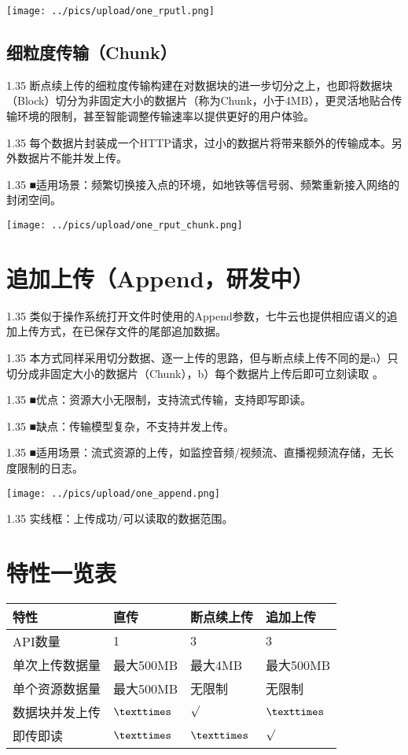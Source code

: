 \documentclass[11pt, oneside]{book}
\newcommand{\qpara}[1]{
\vspace{0.4em}
\begin{spacing}{1.35}
\noindent
#1\par
\end{spacing}
\vspace{0.4em}
}
\newcommand{\qtable}[1]{\footnotesize\vspace{0.5em}#1\vspace{0.5em}\normalsize}
\begin{document}
\begin{center}
\texttt{[image: ../pics/upload/one\_rputl.png]}
\end{center}

\subsection{细粒度传输（Chunk）}

\qpara{断点续上传的细粒度传输构建在对数据块的进一步切分之上，也即将数据块（Block）切分为非固定大小的数据片（称为Chunk，小于4MB），更灵活地贴合传输环境的限制，甚至智能调整传输速率以提供更好的用户体验。}
\qpara{每个数据片封装成一个HTTP请求，过小的数据片将带来额外的传输成本。另外数据片不能并发上传。}
\qpara{■\thinspace 适用场景：频繁切换接入点的环境，如地铁等信号弱、频繁重新接入网络的封闭空间。}

\begin{center}
\texttt{[image: ../pics/upload/one\_rput\_chunk.png]}
\end{center}

\section{追加上传（Append，研发中）}

\qpara{类似于操作系统打开文件时使用的Append参数，七牛云也提供相应语义的追加上传方式，在已保存文件的尾部追加数据。}
\qpara{本方式同样采用切分数据、逐一上传的思路，但与断点续上传不同的是a）只切分成非固定大小的数据片（Chunk），b）每个数据片上传后即可立刻读取 。}
\qpara{■\thinspace 优点：资源大小无限制，支持流式传输，支持即写即读。}
\qpara{■\thinspace 缺点：传输模型复杂，不支持并发上传。}
\qpara{■\thinspace 适用场景：流式资源的上传，如监控音频/视频流、直播视频流存储，无长度限制的日志。}

\begin{center}
\texttt{[image: ../pics/upload/one\_append.png]}
\end{center}

\qpara{实线框：上传成功/可以读取的数据范围。}

\section{特性一览表}

\qtable{
\def\arraystretch{2}
\begin{tabular}{|l|p{10em}|p{10em}|p{10em}|}
\hline
特性 & 直传 & 断点续上传 & 追加上传 \\
\hline
API数量 & 1 & 3 & 3 \\
\hline
单次上传数据量 & 最大500MB & 最大4MB & 最大500MB \\
\hline
单个资源数据量 & 最大500MB & 无限制 & 无限制 \\
\hline
数据块并发上传 & ${\texttimes}$ & ${\surd}$ & ${\texttimes}$ \\
\hline
即传即读 & ${\texttimes}$ & ${\texttimes}$ & ${\surd}$ \\
\hline
\end{tabular}
}
\end{document}
